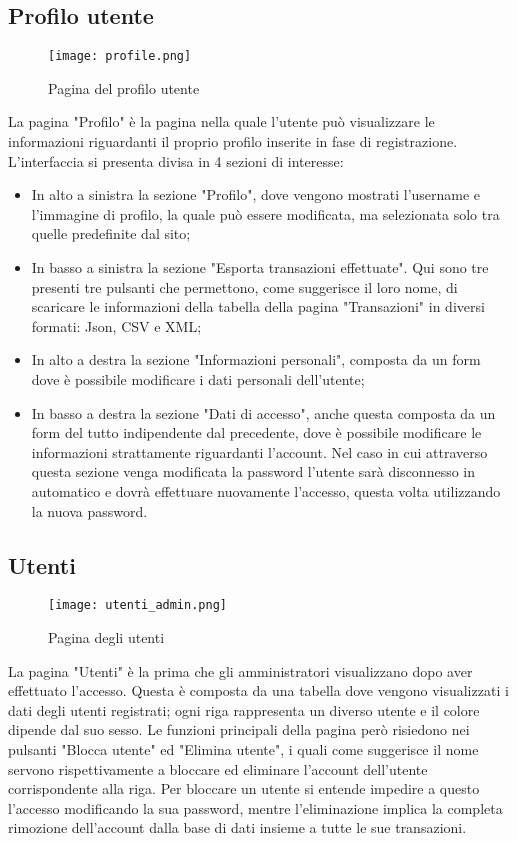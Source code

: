 \documentclass[binding=0.6cm, oneside, noexaminfo, italian]{sapthesis}
\begin{document}
\subsection{Profilo utente}
\begin{figure}[h]
    \centering
    \texttt{[image: profile.png]}
    \caption{Pagina del profilo utente}
    \label{fig:profile}
\end{figure}
La pagina "Profilo" è la pagina nella quale l'utente può visualizzare le informazioni riguardanti il proprio profilo inserite in fase di registrazione. L'interfaccia si presenta divisa in 4 sezioni di interesse:
\begin{itemize}
    \item In alto a sinistra la sezione "Profilo", dove vengono mostrati l'username e l'immagine di profilo, la quale può essere modificata, ma selezionata solo tra quelle predefinite dal sito;
    \item In basso a sinistra la sezione "Esporta transazioni effettuate". Qui sono tre presenti tre pulsanti che permettono, come suggerisce il loro nome, di scaricare le informazioni della tabella della pagina "Transazioni" in diversi formati: Json, CSV e XML;
    \item In alto a destra la sezione "Informazioni personali", composta da un form dove è possibile modificare i dati personali dell'utente;
    \item In basso a destra la sezione "Dati di accesso", anche questa composta da un form del tutto indipendente dal precedente, dove è possibile modificare le informazioni strattamente riguardanti l'account. Nel caso in cui attraverso questa sezione venga modificata la password l'utente sarà disconnesso in automatico e dovrà effettuare nuovamente l'accesso, questa volta utilizzando la nuova password.
\end{itemize}
\subsection{Utenti}
\begin{figure}[h]
    \centering
    \texttt{[image: utenti\_admin.png]}
    \caption{Pagina degli utenti}
    \label{fig:utenti_admin}
\end{figure}
La pagina "Utenti" è la prima che gli amministratori visualizzano dopo aver effettuato l'accesso. Questa è composta da una tabella dove vengono visualizzati i dati degli utenti registrati; ogni riga rappresenta un diverso utente e il colore dipende dal suo sesso. Le funzioni principali della pagina però risiedono nei pulsanti "Blocca utente" ed "Elimina utente", i quali come suggerisce il nome servono rispettivamente a bloccare ed eliminare l'account dell'utente corrispondente alla riga. Per bloccare un utente si entende impedire a questo l'accesso modificando la sua password, mentre l'eliminazione implica la completa rimozione dell'account dalla base di dati insieme a tutte le sue transazioni.
\end{document}
